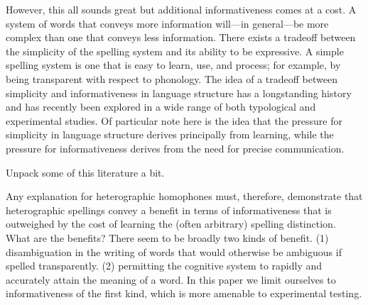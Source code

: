 \documentclass[doc,biblatex]{apa7}
\begin{document}
However, this all sounds great but additional informativeness comes at a cost. A system of words that conveys more information will---in general---be more complex than one that conveys less information. There exists a tradeoff between the simplicity of the spelling system and its ability to be expressive. A simple spelling system is one that is easy to learn, use, and process; for example, by being transparent with respect to phonology. The idea of a tradeoff between simplicity and informativeness in language structure has a longstanding history \parencite{Gabelentz:1891, Zipf:1949, Martinet:1952, Rosch:1978} and has recently been explored in a wide range of both typological \parencite{KempRegier:2012, Kemp:2018} and experimental \parencite{Kirby:2015} studies. Of particular note here is the idea that the pressure for simplicity in language structure derives principally from learning, while the pressure for informativeness derives from the need for precise communication.

Unpack some of this literature a bit.

Any explanation for heterographic homophones must, therefore, demonstrate that heterographic spellings convey a benefit in terms of informativeness that is outweighed by the cost of learning the (often arbitrary) spelling distinction. What are the benefits? There seem to be broadly two kinds of benefit. (1) disambiguation in the writing of words that would otherwise be ambiguous if spelled transparently. (2) permitting the cognitive system to rapidly and accurately attain the meaning of a word. In this paper we limit ourselves to informativeness of the first kind, which is more amenable to experimental testing.
\end{document}
